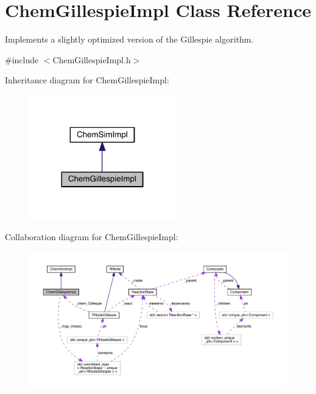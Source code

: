 \hypertarget{classChemGillespieImpl}{\section{Chem\+Gillespie\+Impl Class Reference}
\label{classChemGillespieImpl}
}


Implements a slightly optimized version of the Gillespie algorithm.  




{\ttfamily \#include $<$Chem\+Gillespie\+Impl.\+h$>$}



Inheritance diagram for Chem\+Gillespie\+Impl\+:\nopagebreak
\begin{figure}[H]
\begin{center}
\leavevmode
\includegraphics[width=180pt]{classChemGillespieImpl__inherit__graph}
\end{center}
\end{figure}


Collaboration diagram for Chem\+Gillespie\+Impl\+:\nopagebreak
\begin{figure}[H]
\begin{center}
\leavevmode
\includegraphics[width=350pt]{classChemGillespieImpl__coll__graph}
\end{center}
\end{figure}

